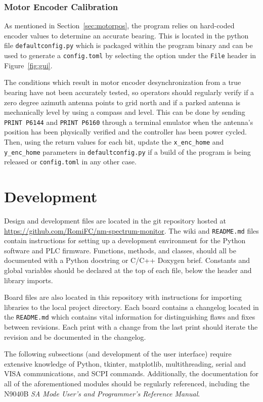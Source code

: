\documentclass[titlepage]{article}
\begin{document}
\subsubsection{Motor Encoder Calibration}
As mentioned in Section~\ref{sec:motorpos}, the program relies on hard-coded encoder values to determine an accurate bearing. This is located in the python file \verb|defaultconfig.py| which is packaged within the program binary and can be used to generate a \verb|config.toml| by selecting the option under the \verb|File| header in Figure~\ref{fig:gui}.

The conditions which result in motor encoder desynchronization from a true bearing have not been accurately tested, so operators should regularly verify if a zero degree azimuth antenna points to grid north and if a parked antenna is mechanically level by using a compass and level. This can be done by sending \verb|PRINT P6144| and \verb|PRINT P6160| through a terminal emulator when the antenna's position has been physically verified and the controller has been power cycled. Then, using the return values for each bit, update the \verb|x_enc_home| and \verb|y_enc_home| parameters in \verb|defaultconfig.py| if a build of the program is being released or \verb|config.toml| in any other case.

\section{Development}\label{sec:dev}
Design and development files are located in the git repository hosted at \url{https://github.com/RomiFC/nm-spectrum-monitor}. The wiki and \verb|README.md| files contain instructions for setting up a development environment for the Python software and PLC firmware. Functions, methods, and classes, should all be documented with a Python docstring or C/C++ Doxygen brief. Constants and global variables should be declared at the top of each file, below the header and library imports.

Board files are also located in this repository with instructions for importing libraries to the local project directory. Each board contains a changelog located in the \verb|README.md| which contains vital information for distinguishing flaws and fixes between revisions. Each print with a change from the last print should iterate the revision and be documented in the changelog.

The following subsections (and development of the user interface) require extensive knowledge of Python, tkinter, matplotlib, multithreading, serial and VISA communications, and SCPI commands. Additionally, the documentation for all of the aforementioned modules should be regularly referenced, including the N9040B \textit{SA Mode User's and Programmer's Reference Manual}.
\end{document}
